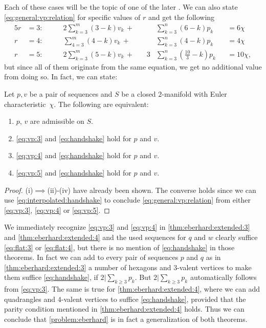 Each of these cases will be the topic of one of the later . We can also state \eqref{eq:general:vp:relation} for specific values of $r$ and get the following
\begin{alignat}{5}
  r &= 3: \qquad &2 \sum_{k=3}^m \left(3 - k \right) v_k\,+\, &&  & \sum_{k=3}^n \left(6 - k \right) p_k &&= 6 \chi \label{eq:vp:3}\\
  r &= 4: \qquad &  \sum_{4=3}^m \left(4 - k \right) v_k\,+\, &&  & \sum_{k=3}^n \left(4 - k \right) p_k &&= 4 \chi  \label{eq:vp:4}\\
  r &= 5: \qquad &2 \sum_{k=3}^m \left(5 - k \right) v_k\,+\, &&3 & \sum_{k=3}^n \left( \tfrac{10}{3} - k \right) p_k &&= 10 \chi, \label{eq:vp:5}
\end{alignat}
but since all of them originate from the same equation, we get no additional value from doing so. In fact, we can state:
\begin{lemma}
  Let $p, v$ be a pair of sequences and $S$ be a closed $2$-manifold with {\sc Euler} characteristic~$\chi$. The following are equivalent:
  \begin{enumerate}[label=(\roman*)]
    \item $p$, $v$ are admissible on $S$.
    \item \eqref{eq:vp:3} and \eqref{eq:handshake} hold for $p$ and $v$.
    \item \eqref{eq:vp:4} and \eqref{eq:handshake} hold for $p$ and $v$.
    \item \eqref{eq:vp:5} and \eqref{eq:handshake} hold for $p$ and $v$.
  \end{enumerate}
  \begin{proof} (i)$\implies$(ii)-(iv) have already been shown. The converse holds since we can use \eqref{eq:interpolated:handshake} to conclude \eqref{eq:general:vp:relation} from either \eqref{eq:vp:3}, \eqref{eq:vp:4} or \eqref{eq:vp:5}.
  \end{proof}
\end{lemma}

\begin{remark}
  We immediately recognize \eqref{eq:vp:3} and \eqref{eq:vp:4} in \autoref{thm:eberhard:extended:3} and \autoref{thm:eberhard:extended:4} and the used sequences for $q$ and $w$ clearly suffice \eqref{eq:flat:3} or \eqref{eq:flat:4}, but there is no mention of \eqref{eq:handshake} in those theorems. In fact we can add to every pair of sequences $p$ and $q$ as in \autoref{thm:eberhard:extended:3} a number of hexagons and $3$-valent vertices to make them suffice \eqref{eq:handshake}, if $2 | \sum_{k \geq 3} p_k$. But $2 | \sum_{k \geq 3} p_k$ automatically follows from \eqref{eq:vp:3}. The same is true for \autoref{thm:eberhard:extended:4}, where we can add quadrangles and $4$-valent vertices to suffice \eqref{eq:handshake}, provided that the parity condition mentioned in \autoref{thm:eberhard:extended:4} holds. Thus we can conclude that \autoref{problem:eberhard} is in fact a generalization of both theorems. 
\end{remark}

